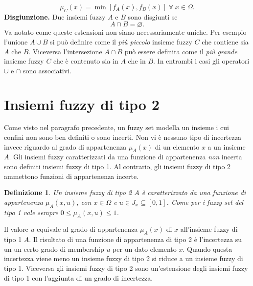 \documentclass [11pt,a4paper,twoside,openright] {book}
\newtheorem{fuzzyset2}{Definizione}
\begin{document}
\begin{equation} \mu_C(x) = \min[f_A(x), f_B(x)] \; \forall \; x \in \Omega. \end{equation} 
\textbf{Disgiunzione.} Due insiemi fuzzy $A$ e $B$ sono disgiunti se
\begin{equation} A \cap B = \varnothing. \end{equation} 
Va notato come queste estensioni non siano necessariamente uniche. Per esempio l'unione $A \cup B$ si può definire come il \textit{più piccolo} insieme fuzzy $C$ che contiene sia $A$ che $B$. Viceversa l'intersezione $A \cap B$ può essere definita come il \textit{più grande} insieme fuzzy $C$ che è contenuto sia in $A$ che in $B$. In entrambi i casi gli operatori $\cup$ e $\cap$ sono associativi.
\section{Insiemi fuzzy di tipo 2}
Come visto nel paragrafo precedente, un fuzzy set modella un insieme i cui confini non sono ben definiti o sono incerti. Non vi è nessuno tipo di incertezza invece riguardo al grado di appartenenza $\mu_A(x)$ di un elemento $x$ a un insieme $A$. Gli insiemi fuzzy caratterizzati da una funzione di appartenenza \textit{non} incerta sono definiti insiemi fuzzy di tipo 1. Al contrario, gli insiemi fuzzy di tipo 2 ammettono funzioni di appartenenza incerte\cite{mendel2002type}.
\begin{fuzzyset2}
Un insieme fuzzy di tipo 2 $A$ è caratterizzato da una funzione di appartenenza $\mu_A(x,u)$, con $x \in \Omega$ e $u \in J_x \subseteq [0,1]$. Come per i fuzzy set del tipo 1 vale sempre $0 \leq \mu_A(x,u) \leq 1$.
\end{fuzzyset2}
Il valore $u$ equivale al grado di appartenenza $\mu_A(x)$ di $x$ all'insieme fuzzy di tipo 1 $A$. Il risultato di una funzione di appartenenza di tipo 2 è l'incertezza su un un certo grado di membership $u$ per un dato elemento $x$. Quando questa incertezza viene meno un insieme fuzzy di tipo 2 si riduce a un insieme fuzzy di tipo 1. Viceversa gli insiemi fuzzy di tipo 2 sono un'estensione degli insiemi fuzzy di tipo 1 con l'aggiunta di un grado di incertezza.
\end{document}
